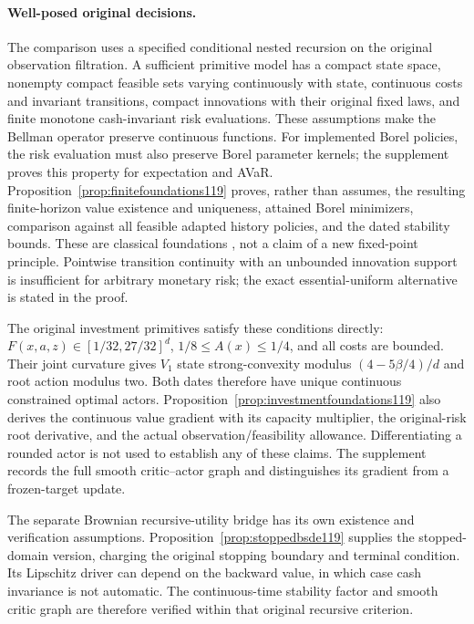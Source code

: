 \paragraph{Well-posed original decisions.}
The comparison uses a specified conditional nested recursion on the
original observation filtration.  A sufficient primitive model has a
compact state space, nonempty compact feasible sets varying continuously
with state, continuous costs and invariant transitions, compact
innovations with their original fixed laws, and finite monotone
cash-invariant risk evaluations.  These assumptions make the Bellman
operator preserve continuous functions.  For implemented Borel policies,
the risk evaluation must also preserve Borel parameter kernels; the
supplement proves this property for expectation and AVaR.
Proposition~\ref{prop:finitefoundations119} proves, rather than
assumes, the resulting finite-horizon value existence and uniqueness,
attained Borel minimizers, comparison against all feasible adapted
history policies, and the dated stability bounds.  These are classical
foundations \citep{ruszczynski2010risk,ruszczynski2014erratum},
not a claim of a new fixed-point principle.  Pointwise transition
continuity with an unbounded innovation support is insufficient for
arbitrary monetary risk; the exact essential-uniform alternative is
stated in the proof.

The original investment primitives satisfy these conditions directly:
$F(x,a,z)\in[1/32,27/32]^d$, $1/8\le A(x)\le1/4$,
and all costs are bounded.  Their joint curvature gives
$V_1$ state strong-convexity modulus $(4-5\beta/4)/d$ and
root action modulus two.  Both dates therefore have unique continuous
constrained optimal actors.  Proposition~\ref{prop:investmentfoundations119}
also derives the continuous value gradient with its capacity multiplier,
the original-risk root derivative, and the actual observation/feasibility
allowance.  Differentiating a rounded actor is not used to establish
any of these claims.  The supplement records the full smooth critic--actor
graph and distinguishes its gradient from a frozen-target update.

The separate Brownian recursive-utility bridge has its own existence
and verification assumptions.  Proposition~\ref{prop:stoppedbsde119}
supplies the stopped-domain version, charging the original stopping
boundary and terminal condition.  Its Lipschitz driver can depend on
the backward value, in which case cash invariance is not automatic.
The continuous-time stability factor and smooth critic graph are
therefore verified within that original recursive criterion.
